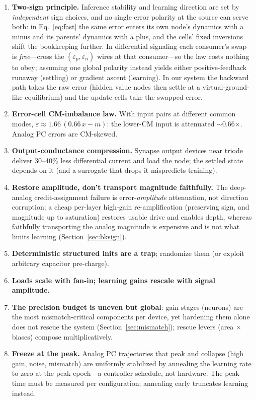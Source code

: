 \documentclass[11pt]{article}
\newcommand{\eps}{\varepsilon}
\begin{document}
\begin{enumerate}
\item \textbf{Two-sign principle.} Inference stability and learning direction are set by \emph{independent} sign choices, and no single error polarity at the source can serve both: in Eq.~\eqref{eq:fast} the same error enters its own node's dynamics with a minus and its parents' dynamics with a plus, and the cells' fixed inversions shift the bookkeeping further. In differential signaling each consumer's swap is \emph{free}---cross the $(\eps_p,\eps_n)$ wires at that consumer---so the law costs nothing to obey; assuming one global polarity instead yields either positive-feedback runaway (settling) or gradient ascent (learning). In our system the backward path takes the raw error (hidden value nodes then settle at a virtual-ground-like equilibrium) and the update cells take the swapped error.
\item \textbf{Error-cell CM-imbalance law.} With input pairs at different common modes, $\eps \approx 1.66\,(0.66\,x - m)$: the lower-CM input is attenuated $\sim$0.66$\times$. Analog PC errors are CM-skewed.
\item \textbf{Output-conductance compression.} Synapse output devices near triode deliver 30--40\% less differential current and load the node; the settled state depends on it (and a surrogate that drops it mispredicts training).
\item \textbf{Restore amplitude, don't transport magnitude faithfully.} The deep-analog credit-assignment failure is error-\emph{amplitude} attenuation, not direction corruption; a cheap per-layer high-gain re-amplification (preserving sign, and magnitude up to saturation) restores usable drive and enables depth, whereas faithfully transporting the analog magnitude is expensive and is not what limits learning (Section~\ref{sec:bksign}).
\item \textbf{Deterministic structured inits are a trap}; randomize them (or exploit arbitrary capacitor pre-charge).
\item \textbf{Loads scale with fan-in; learning gains rescale with signal amplitude.}
\item \textbf{The precision budget is uneven but global}: gain stages (neurons) are the most mismatch-critical components per device, yet hardening them alone does not rescue the system (Section~\ref{sec:mismatch}); rescue levers (area $\times$ biases) compose multiplicatively.
\item \textbf{Freeze at the peak.} Analog PC trajectories that peak and collapse (high gain, noise, mismatch) are uniformly stabilized by annealing the learning rate to zero at the peak epoch---a controller schedule, not hardware. The peak time must be measured per configuration; annealing early truncates learning instead.

\end{enumerate}
\end{document}
